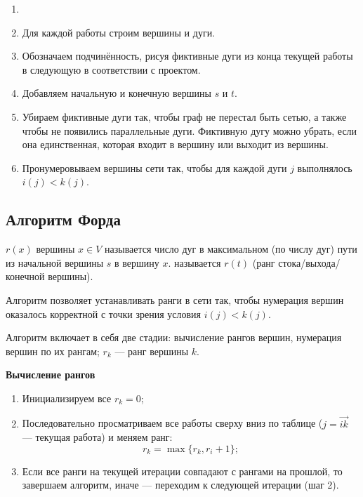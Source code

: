 \label{alg:building_network_model}

\begin{enumerate}[nosep]
	\item[]
	
	\item Для каждой работы строим вершины и дуги.
	
	\item Обозначаем подчинённость, рисуя фиктивные дуги из конца текущей работы в следующую в соответствии с проектом.
	
	\item Добавляем начальную и конечную вершины $s$ и $t$.
	
	\item Убираем фиктивные дуги так, чтобы граф не перестал быть сетью, а также чтобы не появились параллельные дуги. Фиктивную дугу можно убрать, если она единственная, которая входит в вершину или выходит из вершины.
	
	\item Пронумеровываем вершины сети так, чтобы для каждой дуги $j$ выполнялось $i(j) < k(j)$.
\end{enumerate}

\subsection{Алгоритм Форда}


 $r(x)$ вершины $x \in V$ называется число дуг в максимальном (по числу дуг) пути из начальной вершины $s$ в вершину $x$.  называется $r(t)$ (ранг стока/выхода/конечной вершины).

\algorithm[Форда]\label{alg:ford}

Алгоритм позволяет устанавливать ранги в сети так, чтобы нумерация вершин оказалось корректной с точки зрения условия $i(j) < k(j)$.

Алгоритм включает в себя две стадии: вычисление рангов вершин, нумерация вершин по их рангам; $r_k$ --- ранг вершины $k$.

\bigskip

\textbf{Вычисление рангов}
\begin{enumerate}[nosep]
	\item Инициализируем все $r_k = 0$;
	
	\item Последовательно просматриваем все работы сверху вниз по таблице ($j = \vec{ik}$ --- текущая работа) и меняем ранг:
	\[
	r_k = \max\{r_k, r_i+1\};
	\]
	
	\item Если все ранги на текущей итерации совпадают с рангами на прошлой, то завершаем алгоритм, иначе --- переходим к следующей итерации (шаг 2).
\end{enumerate}

